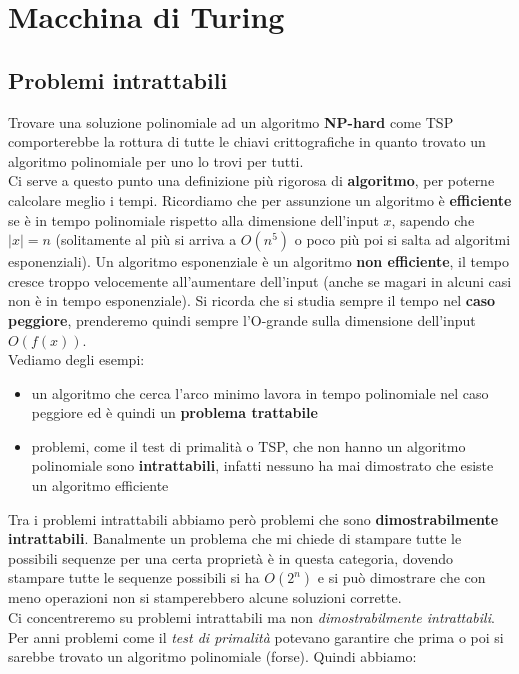 
\chapter{Macchina di Turing}

\label{Capitolo 3}
\section{Problemi intrattabili}
Trovare una soluzione polinomiale ad un algoritmo \textbf{NP-hard} come TSP
comporterebbe la rottura di tutte le chiavi crittografiche in quanto trovato un
algoritmo polinomiale per uno lo trovi per tutti.\\
Ci serve a questo punto una definizione più rigorosa di \textbf{algoritmo}, per
poterne calcolare meglio i tempi. Ricordiamo che per assunzione un algoritmo è
\textbf{efficiente} se è in tempo polinomiale rispetto alla dimensione
dell'input $x$, sapendo che $|x|=n$ (solitamente al più si arriva a $O(n^5)$ o
poco più poi si salta ad algoritmi esponenziali). Un algoritmo esponenziale è un
algoritmo \textbf{non efficiente}, il tempo cresce troppo velocemente
all'aumentare dell'input (anche se magari in alcuni casi non è in tempo
esponenziale). Si ricorda che si studia sempre il tempo nel 
\textbf{caso peggiore}, prenderemo quindi sempre l'O-grande sulla dimensione
dell'input $O(f(x))$.\\
Vediamo degli esempi:
\begin{itemize}
  \item un algoritmo che cerca l'arco minimo lavora in tempo polinomiale nel
  caso peggiore ed è quindi un \textbf{problema trattabile}
  \item problemi, come il test di primalità o TSP, che non hanno un algoritmo
  polinomiale sono \textbf{intrattabili}, infatti nessuno ha mai dimostrato che
  esiste un algoritmo efficiente
\end{itemize}
Tra i problemi intrattabili abbiamo però problemi che sono
\textbf{dimostrabilmente intrattabili}. Banalmente un problema che mi chiede di
stampare tutte le possibili sequenze per una certa proprietà è in questa
categoria, dovendo stampare tutte le sequenze possibili si ha $O(2^n)$ e si può
dimostrare che con meno operazioni non si stamperebbero alcune soluzioni
corrette.\\
Ci concentreremo su problemi intrattabili ma non \textit{dimostrabilmente
  intrattabili}.\\
Per anni problemi come il \textit{test di primalità} potevano garantire che
prima o poi si sarebbe trovato un algoritmo polinomiale (forse). Quindi abbiamo:
